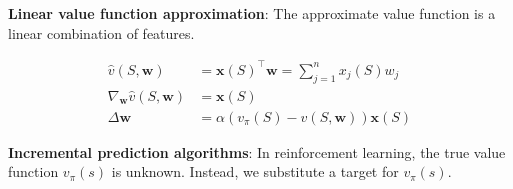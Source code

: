 \noindent \textbf{Linear value function approximation}: The approximate value function is a linear
combination of features.

\begin{align*}
    \hat{v}(S, \mathbf{w})                   & = \mathbf{x}(S)^\top \mathbf{w} = \sum_{j=1}^n x_j(S) w_j  \\
    \nabla_\mathbf{w} \hat{v}(S, \mathbf{w}) & = \mathbf{x}(S)                                            \\
    \Delta \mathbf{w}                        & = \alpha (v_\pi(S) - \hat{v}(S, \mathbf{w})) \mathbf{x}(S)
\end{align*}

\noindent \textbf{Incremental prediction algorithms}: In reinforcement learning, the true value
function $v_\pi(s)$ is unknown. Instead, we substitute a target for $v_\pi(s)$.

